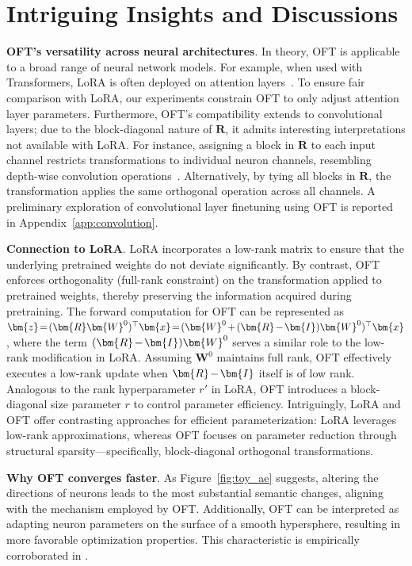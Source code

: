 {\section{Intriguing Insights and Discussions}

\textbf{OFT's versatility across neural architectures}. In theory, OFT is applicable to a broad range of neural network models. For example, when used with Transformers, LoRA is often deployed on attention layers~\cite{hulora2022}. To ensure fair comparison with LoRA, our experiments constrain OFT to only adjust attention layer parameters. Furthermore, OFT's compatibility extends to convolutional layers; due to the block-diagonal nature of $\bm{R}$, it admits interesting interpretations not available with LoRA. For instance, assigning a block in $\bm{R}$ to each input channel restricts transformations to individual neuron channels, resembling depth-wise convolution operations~\cite{chollet2017xception}. Alternatively, by tying all blocks in $\bm{R}$, the transformation applies the same orthogonal operation across all channels. A preliminary exploration of convolutional layer finetuning using OFT is reported in Appendix~\ref{app:convolution}.

\textbf{Connection to LoRA}. LoRA incorporates a low-rank matrix to ensure that the underlying pretrained weights do not deviate significantly. By contrast, OFT enforces orthogonality (full-rank constraint) on the transformation applied to pretrained weights, thereby preserving the information acquired during pretraining. The forward computation for OFT can be represented as $\thickmuskip=2mu \medmuskip=2mu \bm{z}=(\bm{R}\bm{W}^0)^\top\bm{x}=(\bm{W}^0+(\bm{R}-\bm{I})\bm{W}^0)^\top\bm{x}$, where the term $\thickmuskip=2mu \medmuskip=2mu (\bm{R}-\bm{I})\bm{W}^0$ serves a similar role to the low-rank modification in LoRA. Assuming $\bm{W}^0$ maintains full rank, OFT effectively executes a low-rank update when $\thickmuskip=2mu \medmuskip=2mu \bm{R}-\bm{I}$ itself is of low rank. Analogous to the rank hyperparameter $r'$ in LoRA, OFT introduces a block-diagonal size parameter $r$ to control parameter efficiency. Intriguingly, LoRA and OFT offer contrasting approaches for efficient parameterization: LoRA leverages low-rank approximations, whereas OFT focuses on parameter reduction through structural sparsity—specifically, block-diagonal orthogonal transformations.

\textbf{Why OFT converges faster}. As Figure~\ref{fig:toy_ae} suggests, altering the directions of neurons leads to the most substantial semantic changes, aligning with the mechanism employed by OFT. Additionally, OFT can be interpreted as adapting neuron parameters on the surface of a smooth hypersphere, resulting in more favorable optimization properties. This characteristic is empirically corroborated in \cite{liu2021orthogonal}.

}
